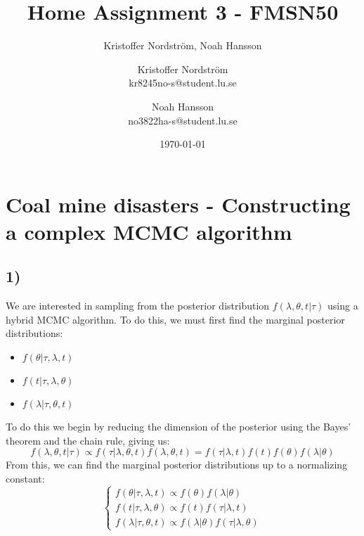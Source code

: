 \documentclass[a4paper]{article}
\title{Home Assignment 3 - FMSN50}
\author{Kristoffer Nordström, Noah Hansson}\author{Kristoffer Nordström \\ kr8245no-s@student.lu.se \and  Noah Hansson \\ no3822ha-s@student.lu.se}
\date{\today}
\begin{document}
\maketitle
\newpage

\section*{Coal mine disasters - Constructing a complex MCMC algorithm}


\subsection*{1)}
We are interested in sampling from the posterior distribution $f(\lambda, \theta, t | \tau)$ using a hybrid MCMC algorithm. To do this, we must first find the marginal posterior distributions:
\begin{itemize}
    \item $f(\theta | \tau, \lambda, t)$
    \item $f(t | \tau, \lambda, \theta)$
    \item $f(\lambda | \tau, \theta, t)$
\end{itemize}

To do this we begin by reducing the dimension of the posterior using the Bayes' theorem and the chain rule, giving us:
\begin{equation}
    f(\lambda, \theta, t | \tau) \propto f(\tau|\lambda, \theta, t)f(\lambda, \theta,t) = f(\tau|\lambda,t)f(t)f(\theta)f(\lambda|\theta)
\end{equation}
From this, we can find the marginal posterior distributions up to a normalizing constant:
\begin{equation}
    \begin{cases}
        f(\theta | \tau, \lambda, t) \propto f(\theta)f(\lambda|\theta) \\
        f(t | \tau, \lambda, \theta) \propto f(t)f(\tau|\lambda,t) \\
        f(\lambda | \tau, \theta, t) \propto f(\lambda|\theta)f(\tau|\lambda,\theta)
    \end{cases}
\end{equation}
\end{document}
